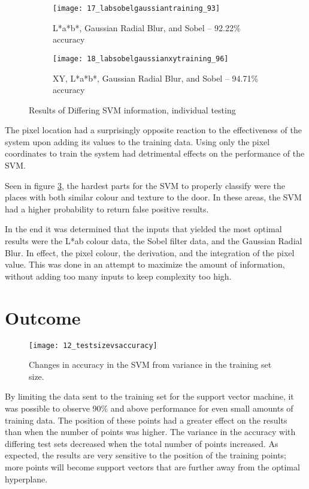 \begin{figure}
        \begin{subfigure}[b]{0.3\textwidth}
                \centering
                \texttt{[image: 17\_labsobelgaussiantraining\_93]}
                \caption{L*a*b*, Gaussian Radial Blur, and Sobel -- 92.22\% accuracy}
                \label{fig:17_labsobelgaussiantraining_93}
        \end{subfigure}
        \begin{subfigure}[b]{0.3\textwidth}
                \centering
                \texttt{[image: 18\_labsobelgaussianxytraining\_96]}
                \caption{XY, L*a*b*, Gaussian Radial Blur, and Sobel -- 94.71\% accuracy}
                \label{fig:18_labsobelgaussianxytraining_96}
        \end{subfigure}
        \caption{Results of Differing SVM information, individual testing}\label{fig:labResults}
\end{figure}
The pixel location had a surprisingly opposite reaction to the effectiveness of the system upon adding its values to the training data. Using only the pixel coordinates to train the system had detrimental effects on the performance of the SVM. 

Seen in figure \ref{fig:labResults}, the hardest parts for the SVM to properly classify were the places with both similar colour and texture to the door. In these areas, the SVM had a higher probability to return false positive results.

In the end it was determined that the inputs that yielded the most optimal results were the L*ab colour data, the Sobel filter data, and the Gaussian Radial Blur. In effect, the pixel colour, the derivation, and the integration of the pixel value. This was done in an attempt to maximize the amount of information, without adding too many inputs to keep complexity too high.

\newpage

\section{Outcome}

\begin{figure}[ht]
    \centering
    \texttt{[image: 12\_testsizevsaccuracy]}
    \caption{Changes in accuracy in the SVM from variance in the training set size.}
    \label{fig:12_testsizevsaccuracy}
\end{figure}

By limiting the data sent to the training set for the support vector machine, it was possible to observe 90\% and above performance for even small amounts of training data. The position of these points had a greater effect on the results than when the number of points was higher. The variance in the accuracy with differing test sets decreased when the total number of points increased. As expected, the results are very sensitive to the position of the training points; more points will become support vectors that are further away from the optimal hyperplane.







